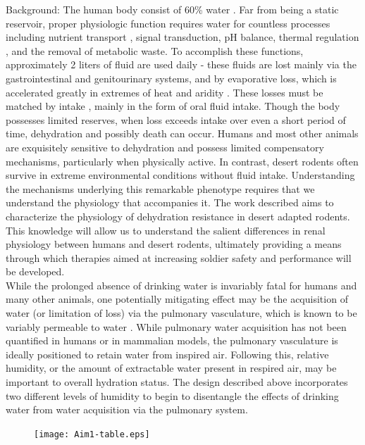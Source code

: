\documentclass[12pt]{article}
\begin{document}
Background: The human body consist of 60\% water \citep{Jequier:2009cz}. Far from being a static reservoir, proper physiologic function requires water for countless processes including nutrient transport \citep{Haussinger:1996wl}, signal transduction, pH balance, thermal regulation \citep{Montain:1999ux}, and the removal of metabolic waste. To accomplish these functions, approximately 2 liters of fluid are used daily - these fluids are lost mainly via the gastrointestinal and genitourinary systems, and by evaporative loss, which is accelerated greatly in extremes of heat and aridity \citep{Cheuvront:2010eg}. These losses must be matched by intake \citep{Jequier:2009cz}, mainly in the form of oral fluid intake. Though the body possesses limited reserves, when loss exceeds intake over even a short period of time, dehydration and possibly death can occur. Humans and most other animals are exquisitely sensitive to dehydration and possess limited compensatory mechanisms, particularly when physically active. In contrast, desert rodents often survive in extreme environmental conditions without fluid intake. Understanding the mechanisms underlying this remarkable phenotype requires that we understand the physiology that accompanies it. The work described aims to characterize the physiology of dehydration resistance in desert adapted rodents. This knowledge will allow us to understand the salient differences in renal physiology between humans and desert rodents, ultimately providing a means through which therapies aimed at increasing soldier safety and performance will be developed.    \\

While the prolonged absence of drinking water is invariably fatal for humans and many other animals, one potentially mitigating effect may be the acquisition of water (or limitation of loss) via the pulmonary vasculature, which is known to be variably permeable to water \citep{Berger:2011ks,Goralski:2010eo}. While pulmonary water acquisition has not been quantified in humans or in mammalian models, the pulmonary vasculature is ideally positioned to retain water from inspired air. Following this, relative humidity, or the amount of extractable water present in respired air, may be important to overall hydration status. The design described above incorporates two different levels of humidity to begin to disentangle the effects of drinking water from water acquisition via the pulmonary system. \\
\begin{figure}
\hypertarget{Table 1}{}
\vspace{-5mm}
\begin{mdframed}
  \begin{center}
    \texttt{[image: Aim1-table.eps]}
  \end{center}
\end{mdframed}
\end{figure}
\end{document}
